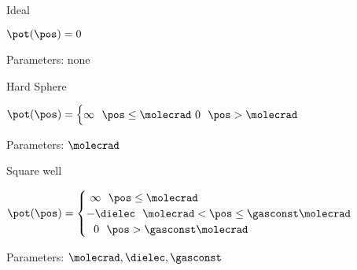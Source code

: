 \begin{bigmdframed}

    
\begin{listone}
    
    \item Ideal
    
    \begin{listtwo}
    
    	\item $\pot(\pos) = 0 $
    
    	\item Parameters: none
    
    \end{listtwo}
    
    \item Hard Sphere
    
    \begin{listtwo}

    	\item $\pot(\pos)=\begin{cases}
                    \infty ~~\pos \leq \molecrad
                    ~0 ~~ \pos > \molecrad\\
                \end{cases}$

      	\item Parameters: $\molecrad$
    
    \end{listtwo}
    
    \item Square well
    
    	\begin{listtwo}
    
    	\item $\pot(\pos)=\begin{cases}
                    ~\infty ~~\pos \leq \molecrad\\
                    -\dielec ~~\molecrad < \pos \leq \gasconst\molecrad\\
                    ~~0 ~~ \pos > \gasconst\molecrad\\
                \end{cases}$
                
      	\item Parameters: $\molecrad, \dielec, \gasconst$
        
    \end{listtwo}
        

\end{listone}
\end{bigmdframed}
